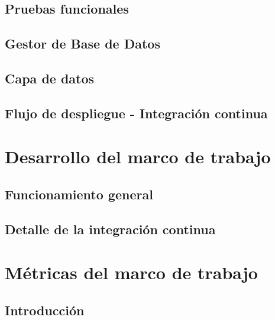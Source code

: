 \documentclass[
  a4paper,  %
  twoside,  %
  bibliography=totoc,
  headsepline,
  cleardoublepage=empty,
  parskip=half,
  draft=false
]{scrbook}
\begin{document}


\section{Pruebas funcionales}
\label{section:e2e-testing}



\section{Gestor de Base de Datos}


\label{section:database-manager}

\section{Capa de datos}


\label{section:data-layer}

\section{Flujo de despliegue - Integración continua}
\label{section:ci-cd-flow}



\chapter{Desarrollo del marco de trabajo}
\label{chap:development}

\section{Funcionamiento general}


\section{Detalle de la integración continua}
\label{chap:ci-cd-detail}


\chapter{Métricas del marco de trabajo}
\label{chap:metrics}

\section{Introducción}

\end{document}
